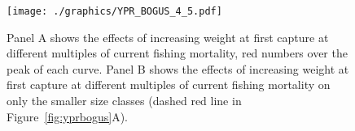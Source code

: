 \documentclass[12pt,letterpaper]{article}
\begin{document}
\begin{figure}
\begin{center}
\texttt{[image: ./graphics/YPR\_BOGUS\_4\_5.pdf]}
\caption{\label{fig:yprmultibogus}
Panel A shows the effects of increasing weight at first capture at
different multiples of current fishing mortality, red numbers over the
peak of each curve.
Panel B shows the effects of increasing weight at first capture at
different multiples of current fishing mortality on only the smaller
size classes (dashed red line in Figure~\ref{fig:yprbogus}A).
}
\end{center}
\end{figure}
\end{document}

